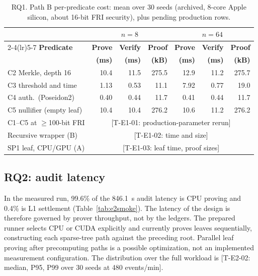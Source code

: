 \documentclass[runningheads]{llncs}
\newif\iffinal
\newcommand{\pending}[2]{\iffinal\errmessage{Unresolved pending result #1}\else{\color{red}[#1: #2]}\fi}
\newcommand{\hd}[1]{{\bfseries\boldmath #1}}
\begin{document}
\begin{table}[t]
\centering
\caption{RQ1. Path B per-predicate cost: mean over 30 seeds (archived, 8-core Apple silicon, about 16-bit FRI security), plus pending production rows.}
\label{tab:rq1}
\scriptsize
\setlength{\tabcolsep}{4pt}
\begin{tabular}{@{}lrrrrrr@{}}
\toprule
& \multicolumn{3}{c}{\hd{$n=8$}} & \multicolumn{3}{c}{\hd{$n=64$}} \\
\cmidrule(lr){2-4}\cmidrule(lr){5-7}
\hd{Predicate} & \hd{Prove} & \hd{Verify} & \hd{Proof} & \hd{Prove} & \hd{Verify} & \hd{Proof} \\
 & \hd{(ms)} & \hd{(ms)} & \hd{(kB)} & \hd{(ms)} & \hd{(ms)} & \hd{(kB)} \\
\midrule
C2 Merkle, depth 16 & 10.4 & 11.5 & 275.5 & 12.9 & 11.2 & 275.7 \\
C3 threshold and time & 1.13 & 0.53 & 11.1 & 7.92 & 0.77 & 19.0 \\
C4 auth.\ (Poseidon2) & 0.40 & 0.44 & 11.7 & 0.41 & 0.44 & 11.7 \\
C5 nullifier (empty leaf) & 10.4 & 10.4 & 276.2 & 10.6 & 11.2 & 276.2 \\
\midrule
C1--C5 at $\ge$100-bit FRI & \multicolumn{6}{c}{\pending{T-E1-01}{production-parameter rerun}} \\
Recursive wrapper (B) & \multicolumn{6}{c}{\pending{T-E1-02}{time and size}} \\
SP1 leaf, CPU/GPU (A) & \multicolumn{6}{c}{\pending{T-E1-03}{leaf time, proof sizes}} \\
\bottomrule
\end{tabular}
\end{table}

\subsection{RQ2: audit latency}
In the measured run, 99.6\% of the 846.1~s audit latency is CPU proving and 0.4\% is L1 settlement (Table~\ref{tab:e2smoke}). The latency of the design is therefore governed by prover throughput, not by the ledgers. The prepared runner selects CPU or CUDA explicitly and currently proves leaves sequentially, constructing each sparse-tree path against the preceding root. Parallel leaf proving after precomputing paths is a possible optimization, not an implemented measurement configuration. The distribution over the full workload is \pending{T-E2-02}{median, P95, P99 over 30 seeds at 480 events/min}.
\end{document}

